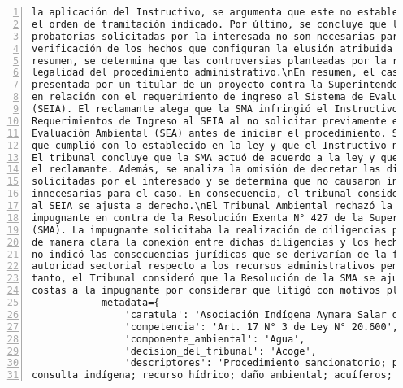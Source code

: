 \begin{Verbatim}[frame=lines, label=Elavoración propia -  Ejemplo de Contexto enviado por el Chatbot a OpenAI
				, fontsize=\scriptsize, numbers=left
				, baselinestretch=0.4
				, formatcom=\color{gray}]
la aplicación del Instructivo, se argumenta que este no establece la obligatoriedad de seguir
el orden de tramitación indicado. Por último, se concluye que las solicitudes de diligencias
probatorias solicitadas por la interesada no son necesarias para confirmar o rechazar la
verificación de los hechos que configuran la elusión atribuida en la resolución impugnada. En
resumen, se determina que las controversias planteadas por la reclamante no afectan la
legalidad del procedimiento administrativo.\nEn resumen, el caso trata sobre una reclamación
presentada por un titular de un proyecto contra la Superintendencia del Medio Ambiente (SMA)
en relación con el requerimiento de ingreso al Sistema de Evaluación de Impacto Ambiental
(SEIA). El reclamante alega que la SMA infringió el Instructivo para la Tramitación de
Requerimientos de Ingreso al SEIA al no solicitar previamente el informe del Servicio de
Evaluación Ambiental (SEA) antes de iniciar el procedimiento. Sin embargo, la SMA argumenta
que cumplió con lo establecido en la ley y que el Instructivo no es de carácter obligatorio.
El tribunal concluye que la SMA actuó de acuerdo a la ley y que no se produjo indefensión para
el reclamante. Además, se analiza la omisión de decretar las diligencias probatorias
solicitadas por el interesado y se determina que no causaron indefensión y que eran
innecesarias para el caso. En consecuencia, el tribunal considera que la resolución de ingreso
al SEIA se ajusta a derecho.\nEl Tribunal Ambiental rechazó la reclamación presentada por la
impugnante en contra de la Resolución Exenta N° 427 de la Superintendencia del Medio Ambiente
(SMA). La impugnante solicitaba la realización de diligencias probatorias, pero no especificó
de manera clara la conexión entre dichas diligencias y los hechos que deseaba probar. Además,
no indicó las consecuencias jurídicas que se derivarían de la falta de pronunciamiento de la
autoridad sectorial respecto a los recursos administrativos pendientes de resolución. Por lo
tanto, el Tribunal consideró que la Resolución de la SMA se ajusta a derecho. No se condenó en
costas a la impugnante por considerar que litigó con motivos plausibles.',
            metadata={
                'caratula': 'Asociación Indígena Aymara Salar de Coposa con SMA ',
                'competencia': 'Art. 17 N° 3 de Ley N° 20.600',
                'componente_ambiental': 'Agua',
                'decision_del_tribunal': 'Acoge',
                'descriptores': 'Procedimiento sancionatorio; programa de cumplimiento;
consulta indígena; recurso hídrico; daño ambiental; acuíferos; criterios; integridad;

\end{Verbatim}
